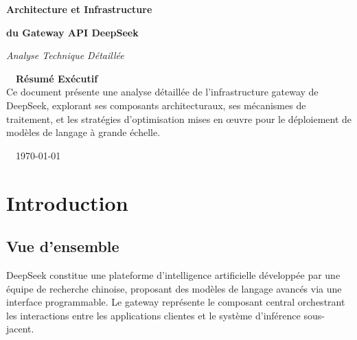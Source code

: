 \documentclass[12pt,a4paper]{article}
\begin{document}
\begin{titlepage}
    \pagecolor{dark}
    \color{white}
    \centering
    \vspace*{1cm}
    
    
    
    \vspace{1cm}
    
    {\Huge\bfseries\color{info} Architecture et Infrastructure\par}
    \vspace{0.3cm}
    
    {\Huge\bfseries du Gateway API DeepSeek\par}
    \vspace{2cm}
    
    {\Large\itshape Analyse Technique Détaillée\par}
    \vspace{1.5cm}
    
    \begin{tcolorbox}[
        colback=primary!15, 
        colframe=info, 
        width=0.85\textwidth, 
        arc=8mm,
        boxrule=2pt,
        shadow={2mm}{-2mm}{0mm}{black!30}
    ]
        \centering
        \color{white}
        \Large\faInfoCircle\ \ \textbf{Résumé Exécutif}\\[0.5cm]
        \normalsize
        Ce document présente une analyse détaillée de l'infrastructure gateway de DeepSeek, explorant ses composants architecturaux, ses mécanismes de traitement, et les stratégies d'optimisation mises en œuvre pour le déploiement de modèles de langage à grande échelle.
    \end{tcolorbox}
    
    \vfill
    
    {\large \faCalendar\ \ \today\par}
    
    \nopagecolor
\end{titlepage}

\color{dark}

\newpage




\tableofcontents


\newpage

\section{ Introduction}

\subsection{Vue d'ensemble}
DeepSeek constitue une plateforme d'intelligence artificielle développée par une équipe de recherche chinoise, proposant des modèles de langage avancés via une interface programmable. Le gateway représente le composant central orchestrant les interactions entre les applications clientes et le système d'inférence sous-jacent.
\end{document}
